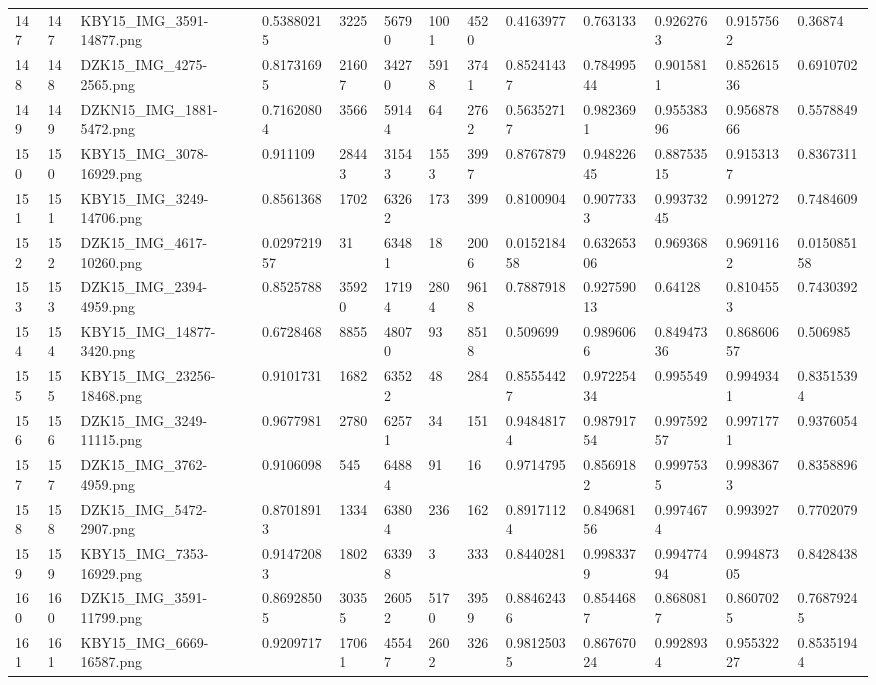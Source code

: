 \documentclass[11pt, a4paper, twoside]{report}
\begin{document}
\begin{longtable}[c]{@{}lllllllllllll@{}}
147 & 147 & KBY15\_IMG\_3591-14877.png & 0.53880215 & 3225 & 56790 & 1001 & 4520 & 0.4163977 & 0.763133 & 0.9262763 & 0.9157562 & 0.36874 \\
148 & 148 & DZK15\_IMG\_4275-2565.png & 0.81731695 & 21607 & 34270 & 5918 & 3741 & 0.85241437 & 0.78499544 & 0.9015811 & 0.85261536 & 0.6910702 \\
149 & 149 & DZKN15\_IMG\_1881-5472.png & 0.71620804 & 3566 & 59144 & 64 & 2762 & 0.56352717 & 0.9823691 & 0.95538396 & 0.95687866 & 0.5578849 \\
150 & 150 & KBY15\_IMG\_3078-16929.png & 0.911109 & 28443 & 31543 & 1553 & 3997 & 0.8767879 & 0.94822645 & 0.88753515 & 0.9153137 & 0.8367311 \\
151 & 151 & KBY15\_IMG\_3249-14706.png & 0.8561368 & 1702 & 63262 & 173 & 399 & 0.8100904 & 0.9077333 & 0.99373245 & 0.991272 & 0.7484609 \\
152 & 152 & DZK15\_IMG\_4617-10260.png & 0.029721957 & 31 & 63481 & 18 & 2006 & 0.015218458 & 0.63265306 & 0.969368 & 0.9691162 & 0.015085158 \\
153 & 153 & DZK15\_IMG\_2394-4959.png & 0.8525788 & 35920 & 17194 & 2804 & 9618 & 0.7887918 & 0.92759013 & 0.64128 & 0.8104553 & 0.7430392 \\
154 & 154 & KBY15\_IMG\_14877-3420.png & 0.6728468 & 8855 & 48070 & 93 & 8518 & 0.509699 & 0.9896066 & 0.84947336 & 0.86860657 & 0.506985 \\
155 & 155 & KBY15\_IMG\_23256-18468.png & 0.9101731 & 1682 & 63522 & 48 & 284 & 0.85554427 & 0.97225434 & 0.995549 & 0.9949341 & 0.83515394 \\
156 & 156 & DZK15\_IMG\_3249-11115.png & 0.9677981 & 2780 & 62571 & 34 & 151 & 0.94848174 & 0.98791754 & 0.99759257 & 0.9971771 & 0.9376054 \\
157 & 157 & DZK15\_IMG\_3762-4959.png & 0.9106098 & 545 & 64884 & 91 & 16 & 0.9714795 & 0.8569182 & 0.9997535 & 0.9983673 & 0.8358896 \\
158 & 158 & DZK15\_IMG\_5472-2907.png & 0.87018913 & 1334 & 63804 & 236 & 162 & 0.89171124 & 0.84968156 & 0.9974674 & 0.993927 & 0.7702079 \\
159 & 159 & KBY15\_IMG\_7353-16929.png & 0.91472083 & 1802 & 63398 & 3 & 333 & 0.8440281 & 0.9983379 & 0.99477494 & 0.99487305 & 0.8428438 \\
160 & 160 & DZK15\_IMG\_3591-11799.png & 0.86928505 & 30355 & 26052 & 5170 & 3959 & 0.88462436 & 0.8544687 & 0.8680817 & 0.8607025 & 0.76879245 \\
161 & 161 & KBY15\_IMG\_6669-16587.png & 0.9209717 & 17061 & 45547 & 2602 & 326 & 0.98125035 & 0.86767024 & 0.9928934 & 0.95532227 & 0.85351944 \\

\end{longtable}
\end{document}

